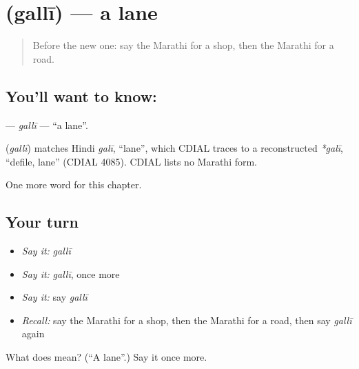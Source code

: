 \section[\texorpdfstring{\mr{गल्ली} (gallī)}{गल्ली (gallī)}]{ (gallī) — a lane}

\label{lesson:MR-C113-galli}



\begin{quote}
Before the new one: say the Marathi for a shop, then the Marathi for a road.
\end{quote}

\subsection*{You'll want to know: }
\textbf{} — \emph{gallī} — \textquotedblleft{}a lane\textquotedblright{}.

\begin{cousinweb}
\textbf{} (\emph{gallī}) matches Hindi \emph{galī}, \textquotedblleft{}lane\textquotedblright{}, which CDIAL traces to a reconstructed \emph{*galī}, \textquotedblleft{}defile, lane\textquotedblright{} (CDIAL 4085). CDIAL lists no Marathi form.
\end{cousinweb}

\begin{grammarlens}[title={What you've built}]
One more word for this chapter.
\end{grammarlens}

\subsection*{Your turn}
\begin{itemize}
\raggedright
  \item \emph{Say it:} \emph{gallī}
  \item \emph{Say it:} \emph{gallī}, once more
  \item \emph{Say it:} say \emph{gallī}
  \item \emph{Recall:} say the Marathi for a shop, then the Marathi for a road, then say \emph{gallī} again
\end{itemize}

\begin{tcolorbox}[breakable,colback=teal!4,colframe=teal!35!black,title={Before you move on}]
What does  mean? (\textquotedblleft{}A lane\textquotedblright{}.) Say it once more.
\end{tcolorbox}

